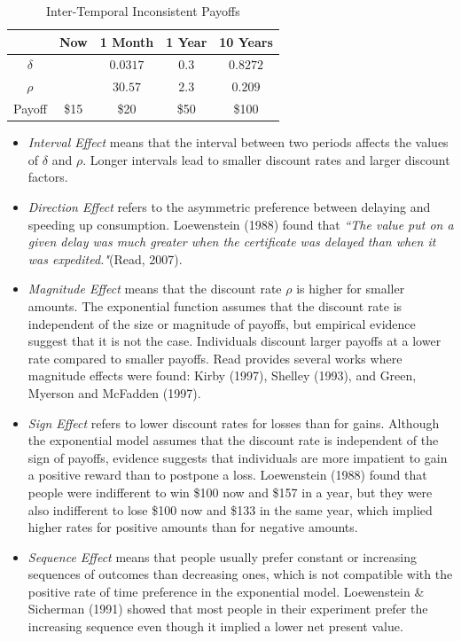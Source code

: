 \documentclass[]{article}
\begin{document}
\begin{table}
    \caption {Inter-Temporal Inconsistent Payoffs} \label{tab:inc}
    \centering
    \begin{tabular}{c c  c c c} 
        & Now   & 1 Month & 1 Year  & 10 Years  \\ 
        \hline 
        $\delta$ &        & $0.0317$  & $0.3$  & $0.8272$  \\ 
        $\rho$   &        & $30.57$   & $2.3$  & $0.209$  \\ 
        Payoff   & \$15   & \$20      & \$50   & \$100  \\ 
        \hline 
    \end{tabular} 
\end{table}

\begin{itemize}
\item
  \emph{Interval Effect} means that the interval between two periods affects the values of \(\delta\) and \(\rho\). Longer intervals lead to smaller discount rates and larger discount factors.\\
\item
  \emph{Direction Effect} refers to the asymmetric preference between delaying and speeding up consumption. Loewenstein (1988) found that \emph{``The value put on a given delay was much greater when the certificate was delayed than when it was expedited."}(Read, 2007).\\
\item
  \emph{Magnitude Effect} means that the discount rate \(\rho\) is higher for smaller amounts. The exponential function assumes that the discount rate is independent of the size or magnitude of payoffs, but empirical evidence suggest that it is not the case. Individuals discount larger payoffs at a lower rate compared to smaller payoffs. Read provides several works where magnitude effects were found: Kirby (1997), Shelley (1993), and Green, Myerson and McFadden (1997).\\
\item
  \emph{Sign Effect} refers to lower discount rates for losses than for gains. Although the exponential model assumes that the discount rate is independent of the sign of payoffs, evidence suggests that individuals are more impatient to gain a positive reward than to postpone a loss. Loewenstein (1988) found that people were indifferent to win \$100 now and \$157 in a year, but they were also indifferent to lose \$100 now and \$133 in the same year, which implied higher rates for positive amounts than for negative amounts.\\
\item
  \emph{Sequence Effect} means that people usually prefer constant or increasing sequences of outcomes than decreasing ones, which is not compatible with the positive rate of time preference in the exponential model. Loewenstein \& Sicherman (1991) showed that most people in their experiment prefer the increasing sequence even though it implied a lower net present value.
\end{itemize}
\end{document}
